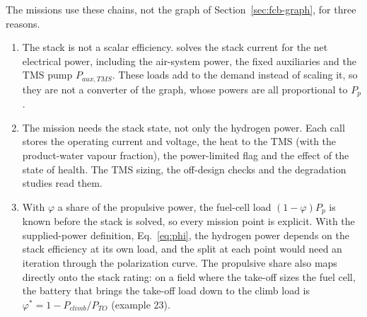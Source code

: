 \documentclass[a4paper,11pt]{article}
\begin{document}
The missions use these chains, not the graph of Section~\ref{sec:fcb-graph}, for three
reasons.
\begin{enumerate}
  \item The stack is not a scalar efficiency.  solves the stack
  current for the net electrical power, including the air-system power, the fixed
  auxiliaries and the TMS pump $P_{aux,TMS}$. These loads add to the demand instead of
  scaling it, so they are not a converter of the graph, whose powers are all proportional
  to $P_p$.
  \item The mission needs the stack state, not only the hydrogen power. Each call stores the
  operating current and voltage, the heat to the TMS (with the product-water vapour
  fraction), the power-limited flag and the effect of the state of health. The TMS sizing,
  the off-design checks and the degradation studies read them.
  \item With $\varphi$ a share of the propulsive power, the fuel-cell load $(1-\varphi)P_p$
  is known before the stack is solved, so every mission point is explicit. With the
  supplied-power definition, Eq.~\eqref{eq:phi}, the hydrogen power depends on the stack
  efficiency at its own load, and the split at each point would need an iteration through
  the polarization curve. The propulsive share also maps directly onto the stack rating: on a
  field where the take-off sizes the fuel cell, the battery that brings the take-off load
  down to the climb load is $\varphi^* = 1 - P_{climb}/P_{TO}$ (example 23).
\end{enumerate}
\end{document}

